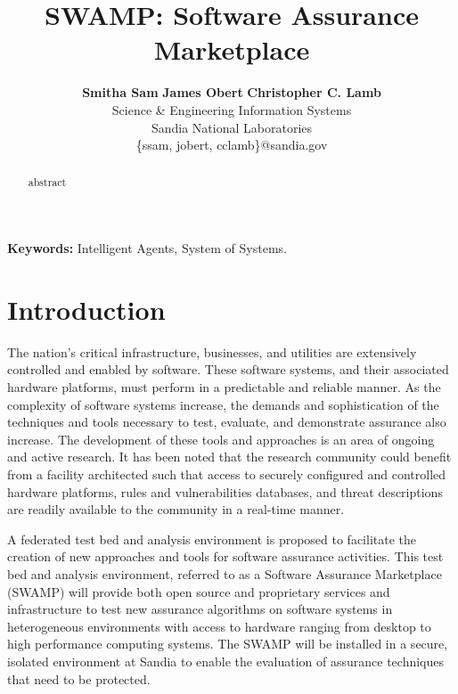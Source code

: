 \documentclass[times, 10pt,twocolumn]{article}
\begin{document}
\title{SWAMP: Software Assurance Marketplace}

\author{
        \textbf{Smitha Sam}\hspace*{0.1in}
        \textbf{James Obert}\hspace*{0.1in}
        \textbf{Christopher C. Lamb}\\
        Science \& Engineering Information Systems \\
        Sandia National Laboratories \\
        \small{\{ssam, jobert, cclamb\}@sandia.gov}
}

\maketitle
\thispagestyle{empty}

\begin{abstract}
abstract
\end{abstract}

{
\setlength{\parindent}{0mm}
\textbf{Keywords:} Intelligent Agents, System of Systems.
}

\section{Introduction}
The nation’s critical infrastructure, businesses, and utilities are extensively controlled and enabled by software. These software systems, and their associated hardware platforms, must perform in a predictable and reliable manner. As the complexity of software systems increase, the demands and sophistication of the techniques and tools necessary to test, evaluate, and demonstrate assurance also increase. The development of these tools and approaches is an area of ongoing and active research.  It has been noted that the research community could benefit from a facility architected such that access to securely configured and controlled hardware platforms, rules and vulnerabilities databases, and threat descriptions are readily available to the community in a real-time manner.

A federated test bed and analysis environment is proposed to facilitate the creation of new approaches and tools for software assurance activities. This test bed and analysis environment, referred to as a Software Assurance Marketplace (SWAMP) will provide both open source and proprietary services and infrastructure to test new assurance algorithms on software systems in heterogeneous environments with access to hardware ranging from desktop to high performance computing systems.   The SWAMP will be installed in a secure, isolated environment at Sandia to enable the evaluation of assurance techniques that need to be protected. 
\end{document}
